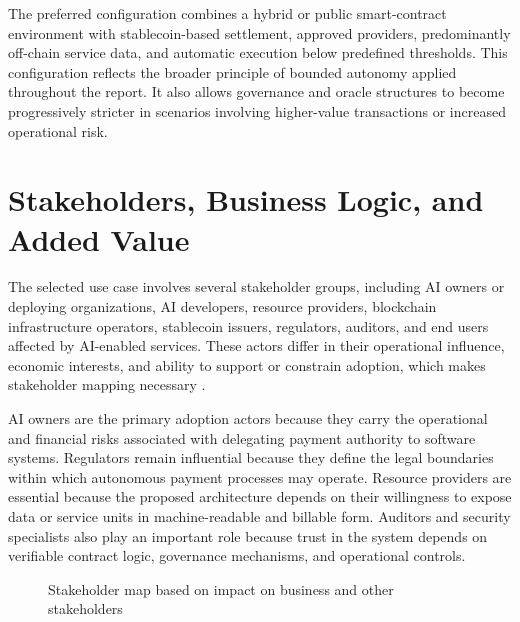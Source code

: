 \documentclass[12pt,a4paper,oneside]{article}
\theoremstyle{definition}
\theoremstyle{plain}
\begin{document}
The preferred configuration combines a hybrid or public smart-contract environment with stablecoin-based settlement, approved providers, predominantly off-chain service data, and automatic execution below predefined thresholds. This configuration reflects the broader principle of bounded autonomy applied throughout the report. It also allows governance and oracle structures to become progressively stricter in scenarios involving higher-value transactions or increased operational risk.

\section{Stakeholders, Business Logic, and Added Value}

The selected use case involves several stakeholder groups, including AI owners or deploying organizations, AI developers, resource providers, blockchain infrastructure operators, stablecoin issuers, regulators, auditors, and end users affected by AI-enabled services. These actors differ in their operational influence, economic interests, and ability to support or constrain adoption, which makes stakeholder mapping necessary \citep{krueger2026workshop1}.

AI owners are the primary adoption actors because they carry the operational and financial risks associated with delegating payment authority to software systems. Regulators remain influential because they define the legal boundaries within which autonomous payment processes may operate. Resource providers are essential because the proposed architecture depends on their willingness to expose data or service units in machine-readable and billable form. Auditors and security specialists also play an important role because trust in the system depends on verifiable contract logic, governance mechanisms, and operational controls.


\begin{figure}[H]
\centering
{}
\caption{Stakeholder map based on impact on business and other stakeholders}
\label{fig:stakeholdermap}
\end{figure}
\end{document}
